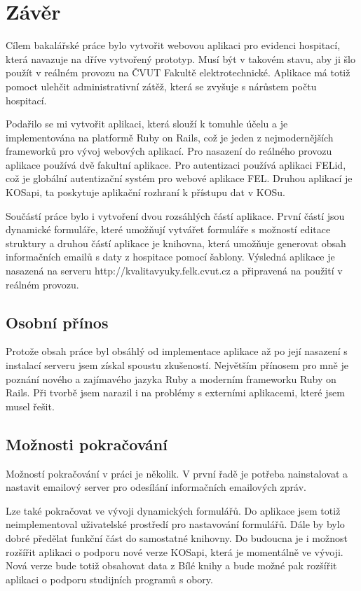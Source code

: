 \chapter{Závěr}

Cílem bakalářské práce bylo vytvořit webovou aplikaci pro evidenci hospitací, která navazuje na dříve vytvořený prototyp. Musí být v takovém stavu, aby ji šlo použít v reálném provozu na ČVUT Fakultě elektrotechnické. Aplikace má totiž pomoct ulehčit administrativní zátěž, která se zvyšuje s nárůstem počtu hospitací. 

Podařilo se mi vytvořit aplikaci, která slouží k tomuhle účelu a je implementována na platformě Ruby on Rails, což je jeden z nejmodernějších frameworků pro vývoj webových aplikací. Pro nasazení do reálného provozu aplikace používá dvě fakultní aplikace. Pro autentizaci používá aplikaci FELid, což je globální autentizační systém pro webové aplikace FEL. Druhou aplikací je KOSapi, ta poskytuje aplikační rozhraní k přístupu dat v KOSu.

Součástí práce bylo i vytvoření dvou rozsáhlých částí aplikace. První částí jsou dynamické formuláře, které umožňují vytvářet formuláře s možností editace struktury a druhou částí aplikace je knihovna, která umožňuje generovat obsah informačních emailů s daty z hospitace pomocí šablony. Výsledná aplikace je nasazená na serveru http://kvalitavyuky.felk.cvut.cz a připravená na použití v reálném provozu.

\section{Osobní přínos}
Protože obsah práce byl obsáhlý od implementace aplikace až po její nasazení s instalací serveru jsem získal spoustu zkušeností. Největším přínosem pro mně je poznání nového a zajímavého jazyka Ruby a moderním  frameworku Ruby on Rails. Při tvorbě jsem narazil i na problémy s externími aplikacemi, které jsem musel řešit.

\section{Možnosti pokračování}
Možností pokračování v práci je několik. V první řadě je potřeba nainstalovat a nastavit emailový server pro odesílání informačních emailových zpráv.

Lze také pokračovat ve vývoji dynamických formulářů. Do aplikace jsem totiž neimplementoval uživatelské prostředí pro nastavování formulářů. Dále by bylo dobré předělat funkční část do samostatné knihovny. Do budoucna je i možnost rozšířit aplikaci o podporu nové verze KOSapi, která je momentálně ve vývoji. Nová verze bude totiž obsahovat data z Bílé knihy a bude možné pak rozšířit aplikaci o podporu studijních programů s obory.